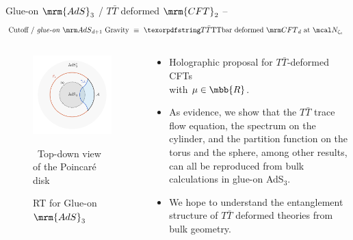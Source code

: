 \documentclass[
	10pt
	,noamsthm
]{beamer}
\newcommand{\TTbar}{\texorpdfstring{\ensuremath{T\bar{T}}}{TTbar}\xspace}
\begin{document}
\begin{frame}{Glue-on $\mrm{AdS}_3$ / \TTbar deformed $\mrm{CFT}_2$}{%
	\textcite{Apolo:2023vnm} -- 
}
\vspace{-2\baselineskip}
\begin{equation*}
\stateGlueon
\end{equation*}
\vspace{-1.3\baselineskip}
\begin{columns}
\begin{column}{.37\textwidth}
\begin{figure}[!h]
	\centering
	\includegraphics[width=\linewidth]{img/RT-AdS.pdf}
	\vspace{-1.5\baselineskip}
	\caption{RT for Glue-on $\mrm{AdS}_3$}
	
	\vspace{-.3\baselineskip}
	\scriptsize\, Top-down view of the Poincar\'e disk
\end{figure}
\end{column}
\hspace{-1em}
\begin{column}{.71\textwidth}
\begin{itemize}
\item Holographic proposal for $T\bar T$-deformed CFTs\\
with $\mu \in \mbb{R}$.

\item As evidence, we show that the $T\bar T$ trace flow equation, the spectrum on the cylinder, and the partition function on the torus and the sphere, among other results, can all be reproduced from bulk calculations in glue-on AdS$_3$.

\pause
\item We hope to understand the entanglement structure of \TTbar deformed theories from bulk geometry. 
\end{itemize}
\end{column}
\end{columns}
\end{frame}
\end{document}
